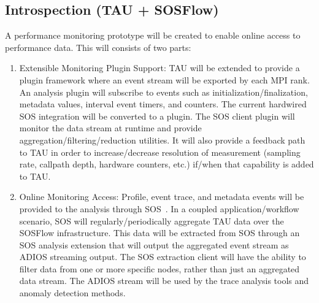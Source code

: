 \subsection{Introspection (TAU + SOSFlow)}
A performance monitoring prototype will be created to enable online access to performance data. This
will consists of two parts:
\begin{enumerate}
\item Extensible Monitoring Plugin Support: TAU will be extended to provide a plugin framework where an event stream will be exported by each MPI rank. An analysis plugin will subscribe to events such as initialization/finalization, metadata values, interval event timers, and counters.  The current hardwired SOS integration will be converted to a plugin. The SOS client plugin will monitor the data stream at runtime and provide aggregation/filtering/reduction utilities.  It will also provide a feedback path to TAU in order to increase/decrease resolution of measurement (sampling rate, callpath depth, hardware counters, etc.) if/when that capability is added to TAU.
\item Online Monitoring Access: Profile, event trace, and metadata events will be provided to the analysis through SOS~\cite{Chad}. In a coupled application/workflow scenario, SOS will regularly/periodically aggregate TAU data over the SOSFlow infrastructure.  This data will be extracted from SOS through an SOS analysis extension that will output the aggregated event stream as ADIOS streaming output.  The SOS extraction client will have the ability to filter data from one or more specific nodes, rather than just an aggregated data stream.  The ADIOS stream will be used by the trace analysis tools and anomaly detection methods.
\end{enumerate}

